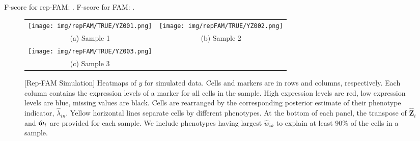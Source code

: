 \documentclass[12pt,]{article}
\def\Z{\bm{Z}}
\newcommand{\bw}{\mbox{\boldmath $w$}}
\begin{document}
F-score for rep-FAM: .
F-score for FAM: .
\begin{figure}[H]
  \begin{center}
  \begin{tabular}{cc}
  \texttt{[image: img/repFAM/TRUE/YZ001.png]}&
  \texttt{[image: img/repFAM/TRUE/YZ002.png]}\\
  {\small (a) Sample 1} & {\small(b) Sample 2} \\
  \texttt{[image: img/repFAM/TRUE/YZ003.png]}&\\
  {\small (c) Sample 3} & \\
  \end{tabular}
  \end{center}
  \vspace{-0.05in}
  \caption{\small[Rep-FAM Simulation]  Heatmaps of $y$ for simulated data.
    Cells and markers are in rows and columns, respectively. Each column
    contains the expression levels of a marker for all cells in the sample.
    High expression levels are red, low expression levels are blue, missing
    values are black.  Cells are rearranged by the corresponding posterior
    estimate of their phenotype indicator, $\hat{\lambda}_{in}$.  Yellow
    horizontal lines separate cells by different phenotypes.  At the bottom of
    each panel, the transpose of $\hat{\Z}_i$ and $\hat{\bw}_i$ are provided
    for each sample.  We include phenotypes having largest $\hat{w}_{ik}$ to
    explain at least 90\% of the cells in a sample.}
\label{fig:repFAM-TRUE-post-Z}
\end{figure}
\end{document}
